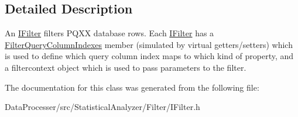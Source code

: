 \subsection{Detailed Description}
An \hyperlink{classIFilter}{I\+Filter} filters P\+Q\+XX database rows. Each \hyperlink{classIFilter}{I\+Filter} has a \hyperlink{structFilterQueryColumnIndexes}{Filter\+Query\+Column\+Indexes} member (simulated by virtual getters/setters) which is used to define which query column index maps to which kind of property, and a filtercontext object which is used to pass parameters to the filter. 

The documentation for this class was generated from the following file\+:\begin{DoxyCompactItemize}
\item 
Data\+Processer/src/\+Statistical\+Analyzer/\+Filter/I\+Filter.\+h\end{DoxyCompactItemize}
